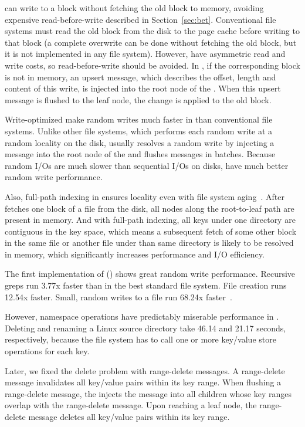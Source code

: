 \betrfs can write to a block without fetching the old block to memory, avoiding
expensive read-before-write described in Section~\ref{sec:bet}.
Conventional file systems must read the old block from the disk to the page
cache before writing to that block (a complete overwrite can be done without
fetching the old block, but it is not implemented in any file system).
However, \bets have asymmetric read and write costs, so read-before-write should
be avoided.
In \betrfs, if the corresponding block is not in memory, an upsert message,
which describes the offset, length and content of this write, is injected into
the root node of the \bet.
When this upsert message is flushed to the leaf node, the change is applied to
the old block.

Write-optimized \bets make random writes much faster in \betrfs than
conventional file systems.
Unlike other file systems,
which performs each random write at a random locality on the disk,
\betrfs usually resolves a random write by injecting a message into the root
node of the \bet
and flushes messages in batches.
Because random I/Os are much slower than sequential I/Os on disks,
\betrfs have much better random write performance.

Also, full-path indexing in \betrfs ensures locality even with file system
aging~\citep{betrfs3}.
After \betrfs fetches one block of a file from the disk, all nodes along the
root-to-leaf path are present in memory.
And with full-path indexing, all keys under one directory are contiguous in the
key space, which means a subsequent fetch of some other block in the same file or
another file under than same directory is likely to be resolved in memory,
which significantly increases performance and I/O efficiency.

The first implementation of \betrfs (\betrfsOne) shows great random write
performance.
Recursive greps run 3.77x faster than in the best standard file system.
File creation runs 12.54x faster.
Small, random writes to a file run 68.24x faster~\citep{betrfs1tos}.

However, namespace operations have predictably miserable performance in
\betrfsOne.
Deleting and renaming a Linux source directory take 46.14 and 21.17 seconds,
respectively, because the file system has to call one or more key/value store
operations for each key.

Later, we fixed the delete problem with range-delete messages.
A range-delete message invalidates all key/value pairs within its key range.
When flushing a range-delete message, the \bet injects the message into all
children whose key ranges overlap with the range-delete message.
Upon reaching a leaf node, the range-delete message deletes all key/value pairs
within its key range.

